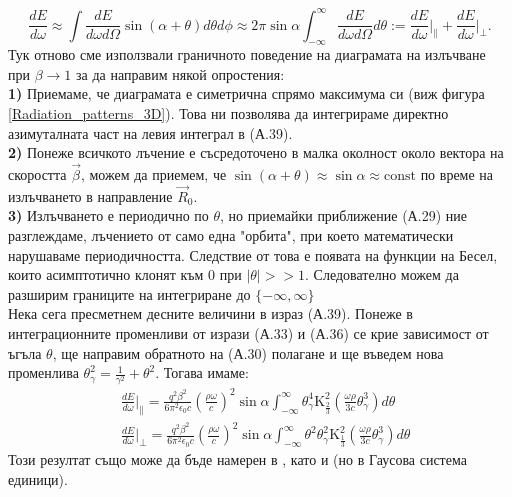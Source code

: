 \begin{appendices}
\begin{equation}
	\frac{dE}{d\omega} \approx \int \frac{dE}{d\omega d\Omega} \sin(\alpha + \theta) d\theta d\phi \approx 2\pi \sin\alpha \int_{-\infty}^\infty \frac{dE}{d\omega d\Omega}d\theta:=\frac{dE}{d\omega}\bigg\vert_\parallel + \frac{dE}{d\omega}\bigg\vert_\perp.
\end{equation}
Тук отново сме използвали граничното поведение на диаграмата на излъчване при $\beta\rightarrow 1$ за да направим някой опростения:\\

\textbf{1)} Приемаме, че диаграмата е симетрична спрямо максимума си (виж фигура \ref{Radiation_patterns_3D}). Това ни позволява да интегрираме директно азимуталната част на левия интеграл в (А.39).\\

\textbf{2)} Понеже всичкото лъчение е съсредоточено в малка околност около вектора на скоростта $\vec{\beta}$, можем да приемем, че $\sin(\alpha + \theta)\approx \sin\alpha\approx\text{const}$ по време на излъчването в направление $\vec{R}_0$.  \\

\textbf{3)} Излъчването е периодично по $\theta$, но приемайки приближение (А.29) ние разглеждаме, лъчението от само една "орбита", при което математически нарушаваме периодичността. Следствие от това е появата на функции на Бесел, които асимптотично клонят към 0 при $|\theta| >> 1$. Следователно можем да разширим границите на интегриране до $\{-\infty, \infty\}$\\

Нека сега пресметнем десните величини в израз (А.39). Понеже в интеграционните променливи от изрази (А.33) и (А.36) се крие зависимост от ъгъла $\theta$, ще направим обратното на (А.30) полагане и ще въведем нова променлива $\theta^2_\gamma = \frac{1}{\gamma^2} + \theta^2$. Тогава имаме:
\begin{equation}
	\begin{split}
		&\frac{dE}{d\omega}\bigg\vert_\parallel = \frac{q^2\beta^2}{6\pi^2\epsilon_0 c}\left(\frac{\rho\omega}{c}\right)^2\sin\alpha \int_{-\infty}^\infty \theta_\gamma^4 \text{K}^2_{\frac{2}{3}}\left(\frac{\omega\rho}{3 c}\theta_\gamma^3\right)d\theta\\
		&\frac{dE}{d\omega}\bigg\vert_\perp = \frac{q^2\beta^2}{6\pi^2\epsilon_0 c}\left(\frac{\rho\omega}{c}\right)^2\sin\alpha \int_{-\infty}^\infty \theta^2\theta_\gamma^2 \text{K}^2_{\frac{1}{3}}\left(\frac{\omega\rho}{3 c}\theta_\gamma^3\right)d\theta
	\end{split}
\end{equation}
Този резултат също може да бъде намерен в \cite{2011hea..book.....L}, като и \cite{Rad_processes} (но в Гаусова система единици).

\end{appendices}
